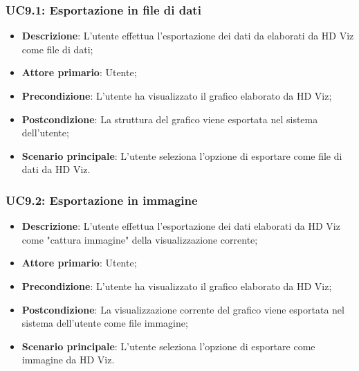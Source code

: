 \subsubsection{UC9.1: Esportazione in file di dati}
\begin{itemize}
    \item{\textbf{Descrizione}}: L'utente effettua l'esportazione dei dati da elaborati da HD Viz come file di dati;
    \item{\textbf{Attore primario}}: Utente;
    \item{\textbf{Precondizione}}: L'utente ha visualizzato il grafico elaborato da HD Viz;
    \item{\textbf{Postcondizione}}: La struttura del grafico viene esportata nel sistema dell'utente;
    \item{\textbf{Scenario principale}}: L'utente seleziona l'opzione di esportare come file di dati da HD Viz.
\end{itemize}

\subsubsection{UC9.2: Esportazione in immagine}
\begin{itemize}
    \item{\textbf{Descrizione}}: L'utente effettua l'esportazione dei dati elaborati da HD Viz come "cattura immagine" della visualizzazione corrente;
    \item{\textbf{Attore primario}}: Utente;
    \item{\textbf{Precondizione}}: L'utente ha visualizzato il grafico elaborato da HD Viz;
    \item{\textbf{Postcondizione}}: La visualizzazione corrente del grafico viene esportata nel sistema dell'utente come file immagine;
    \item{\textbf{Scenario principale}}: L'utente seleziona l'opzione di esportare come immagine da HD Viz.
\end{itemize}
